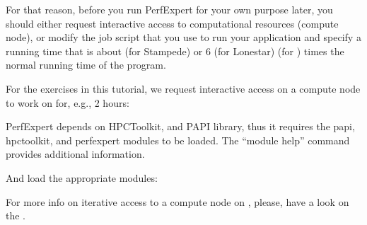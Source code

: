 For that reason, before you run PerfExpert for your own purpose later, you should either request interactive access to computational resources (compute node), or modify the job script that you use to run your application and specify a running time that is about 
 (for Stampede) or 6 (for Lonestar)
 (for \hpcname)
\fi
 times the normal running time of the program.

For the exercises in this tutorial, we request interactive access on a compute node to work on for, e.g., 2 hours:

\iftacc
\begin{prompt}
\end{prompt}
\fi
\ifvsc
\begin{prompt}
\end{prompt}
\fi

PerfExpert depends on HPCToolkit, and PAPI library, thus it requires the papi, hpctoolkit, and perfexpert modules to be loaded. The ``module help'' command provides additional information.

And load the appropriate modules:
\iftacc
\begin{prompt}
\end{prompt}
\fi
\ifvsc
\begin{prompt}
\end{prompt}
\fi
\ifbrussel
\begin{prompt}
\end{prompt}
\fi

For more info on iterative access to a compute node on \hpcname, please, have a look on the \hpcuserguide.

